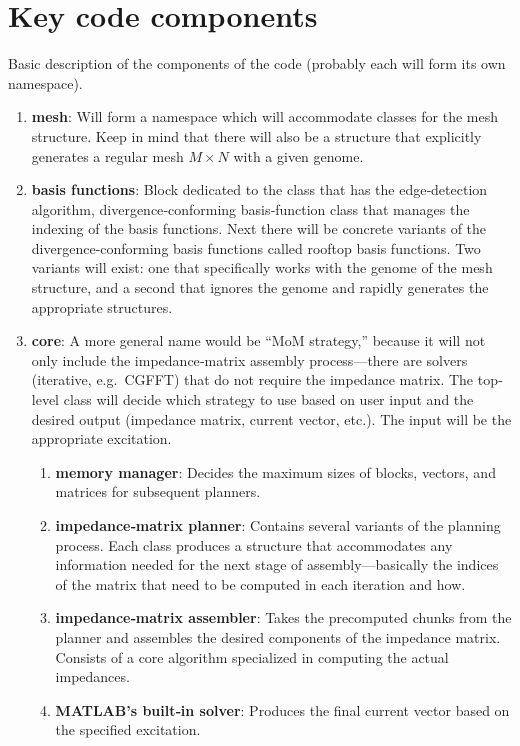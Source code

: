\documentclass[9pt]{article}
\begin{document}
    \section{Key code components}

    Basic description of the components of the code (probably each will form its own namespace).

    \begin{enumerate}[label=\Roman*.]
        \item \textbf{mesh}: Will form a namespace which will accommodate classes for the mesh structure. Keep in mind that there will also be a structure that explicitly generates a regular mesh \(M\times N\) with a given genome.
        \item \textbf{basis functions}: Block dedicated to the class that has the edge‐detection algorithm, divergence‐conforming basis‐function class that manages the indexing of the basis functions. Next there will be concrete variants of the divergence‐conforming basis functions called rooftop basis functions. Two variants will exist: one that specifically works with the genome of the mesh structure, and a second that ignores the genome and rapidly generates the appropriate structures.
        \item \textbf{core}: A more general name would be “MoM strategy,” because it will not only include the impedance‐matrix assembly process—there are solvers (iterative, e.g.\ CGFFT) that do not require the impedance matrix. The top‐level class will decide which strategy to use based on user input and the desired output (impedance matrix, current vector, etc.). The input will be the appropriate excitation.
        \begin{enumerate}[label=\roman*.]
            \item \textbf{memory manager}: Decides the maximum sizes of blocks, vectors, and matrices for subsequent planners.
            \item \textbf{impedance‐matrix planner}: Contains several variants of the planning process. Each class produces a structure that accommodates any information needed for the next stage of assembly—basically the indices of the matrix that need to be computed in each iteration and how.
            \item \textbf{impedance‐matrix assembler}: Takes the precomputed chunks from the planner and assembles the desired components of the impedance matrix. Consists of a core algorithm specialized in computing the actual impedances.
            \item \textbf{MATLAB's built‐in solver}: Produces the final current vector based on the specified excitation.

\end{enumerate}
\end{enumerate}
\end{document}
